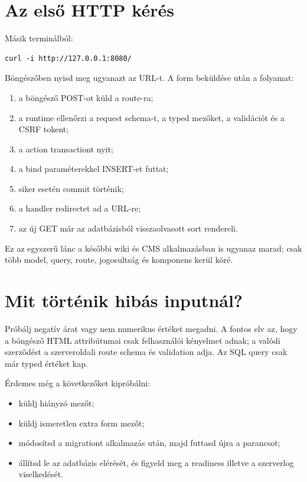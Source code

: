 \section{Az első HTTP kérés}

Másik terminálból:

\begin{lstlisting}
curl -i http://127.0.0.1:8080/
\end{lstlisting}

Böngészőben nyisd meg ugyanazt az URL-t. A form beküldése után a folyamat:

\begin{enumerate}
  \item a böngésző POST-ot küld a  route-ra;
  \item a runtime ellenőrzi a request schema-t, a typed mezőket, a validációt és a CSRF tokent;
  \item a  action transactiont nyit;
  \item a  bind paraméterekkel INSERT-et futtat;
  \item siker esetén commit történik;
  \item a handler redirectet ad a \code{/} URL-re;
  \item az új GET már az adatbázisból visszaolvasott sort rendereli.
\end{enumerate}

Ez az egyszerű lánc a későbbi wiki és CMS alkalmazásban is ugyanaz marad; csak több model, query, route, jogosultság és komponens kerül köré.

\section{Mit történik hibás inputnál?}

Próbálj negatív árat vagy nem numerikus értéket megadni. A fontos elv az, hogy a böngésző HTML attribútumai csak felhasználói kényelmet adnak; a valódi szerződést a szerveroldali route schema és validation adja. Az SQL query csak már typed értéket kap.

Érdemes még a következőket kipróbálni:

\begin{itemize}
  \item küldj hiányzó  mezőt;
  \item küldj ismeretlen extra form mezőt;
  \item módosítsd a migrationt alkalmazás után, majd futtasd újra a  parancsot;
  \item állítsd le az adatbázis elérését, és figyeld meg a readiness illetve a szerverlog viselkedését.
\end{itemize}

